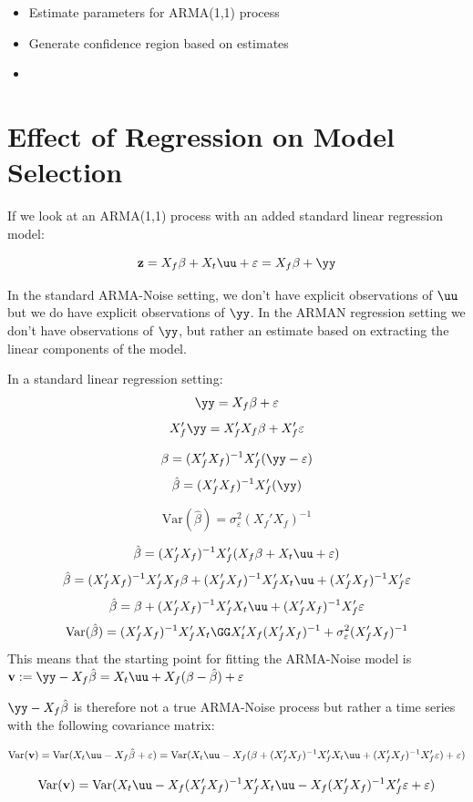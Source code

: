 \begin{itemize}
    \item Estimate parameters for ARMA(1,1) process 
    \item Generate confidence region based on estimates
    \item 
\end{itemize}

\section{Effect of Regression on Model Selection}

If we look at an ARMA(1,1) process with an added standard linear regression model:

$$ \mathbf{z} = X_f\beta + X_t\uu + \varepsilon = X_f\beta + \yy $$

In the standard ARMA-Noise setting, we don't have explicit observations of $\uu$ but we do have explicit observations of $\yy$. In the ARMAN regression setting we don't have observations of $\yy$, but rather an estimate based on extracting the linear components of the model.

In a standard linear regression setting:
$$ \yy = X_f\beta + \varepsilon $$
$$ X_f'\yy = X_f'X_f\beta + X_f'\varepsilon $$

$$ \beta = (X_f'X_f)^{-1}X_f'(\yy - \varepsilon) $$
$$ \hat{\beta }= (X_f'X_f)^{-1}X_f'(\yy) $$

$$ \text{Var}(\hat{\beta}) = \sigma_\varepsilon^2(X_f'X_f)^{-1} $$


$$ \hat{\beta }= (X_f'X_f)^{-1}X_f'(X_f\beta + X_t\uu + \varepsilon) $$
$$ \hat{\beta }= (X_f'X_f)^{-1}X_f'X_f\beta + (X_f'X_f)^{-1}X_f'X_t\uu + (X_f'X_f)^{-1}X_f'\varepsilon $$
$$ \hat{\beta }= \beta + (X_f'X_f)^{-1}X_f'X_t\uu + (X_f'X_f)^{-1}X_f'\varepsilon $$
$$\text{Var}(\hat{\beta}) = (X_f'X_f)^{-1}X_f'X_t\GG X_t'X_f(X_f'X_f)^{-1} + \sigma_\varepsilon^2(X_f'X_f)^{-1}$$
This means that the starting point for fitting the ARMA-Noise model is $\mathbf{v} := \yy - X_f\hat{\beta} = X_t\uu + X_f(\beta-\hat{\beta}) + \varepsilon$

$\yy - X_f\hat{\beta}$ is therefore not a true ARMA-Noise process but rather a time series with the following covariance matrix:

$$ \text{Var}(\mathbf{v}) = \text{Var}(X_t\uu - X_f\hat{\beta} + \varepsilon) = \text{Var}(X_t\uu - X_f(\beta + (X_f'X_f)^{-1}X_f'X_t\uu + (X_f'X_f)^{-1}X_f'\varepsilon) + \varepsilon) $$

$$ \text{Var}(\mathbf{v}) = \text{Var}(X_t\uu - X_f(X_f'X_f)^{-1}X_f'X_t\uu - X_f(X_f'X_f)^{-1}X_f'\varepsilon + \varepsilon) $$

